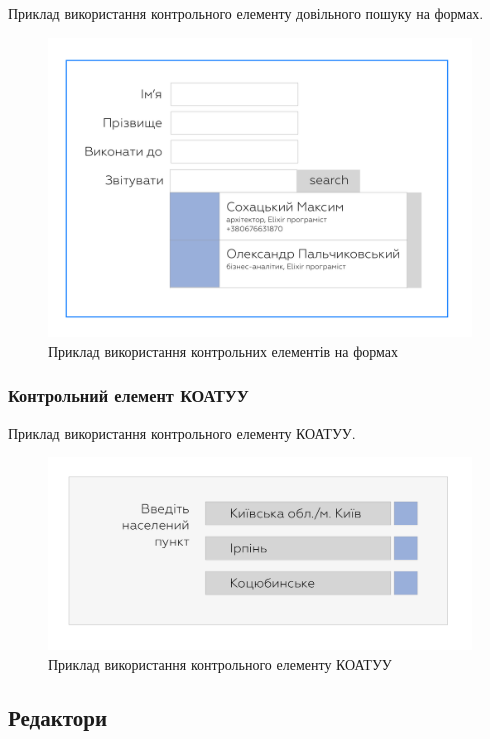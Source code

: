 Приклад використання контрольного елементу довільного пошуку на формах.

\begin{figure}[!htbp]
\centerline{\includegraphics[scale=0.3]{comboLookupForm.png}}
\caption{Приклад використання контрольних елементів на формах}
\end{figure}

\subsubsection{Контрольний елемент КОАТУУ}

Приклад використання контрольного елементу КОАТУУ.

\begin{figure}[!htbp]
\centerline{\includegraphics[scale=0.3]{koatuu.png}}
\caption{Приклад використання контрольного елементу КОАТУУ}
\end{figure}

\newpage
\subsection{Редактори}

